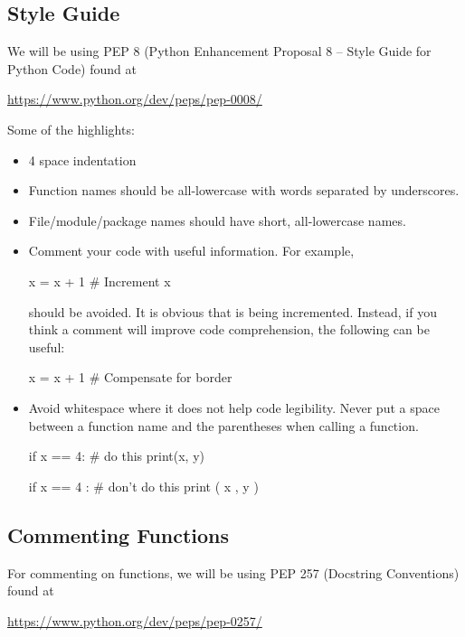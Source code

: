 \documentclass[11pt]{cselabheader}
\begin{document}
\subsection{Style Guide}

We will be using PEP 8 (Python Enhancement Proposal 8 -- Style Guide for Python
Code) found at
\begin{center}
  \url{https://www.python.org/dev/peps/pep-0008/}
\end{center}

Some of the highlights:
\begin{itemize}
  \item 4 space indentation
  \item Function names should be all-lowercase with words separated by underscores.
  \item File/module/package names should have short, all-lowercase names.
  \item Comment your code with useful information. For example,

    \begin{python3code}
x = x + 1 # Increment x
    \end{python3code}

    should be avoided. It is obvious that  is being incremented.
    Instead, if you think a comment will improve code comprehension, the
    following can be useful:

    \begin{python3code}
x = x + 1 # Compensate for border
    \end{python3code}

  \item Avoid whitespace where it does not help code legibility. Never put a
    space between a function name and the parentheses when calling a function.

    \begin{python3code}
if x == 4: # do this
    print(x, y)

if x == 4 : # don't do this
    print ( x , y )
    \end{python3code}
\end{itemize}

\pagebreak
\subsection{Commenting Functions}

For commenting on functions, we will be using PEP 257 (Docstring Conventions)
found at
\begin{center}
  \url{https://www.python.org/dev/peps/pep-0257/}
\end{center}
\end{document}
